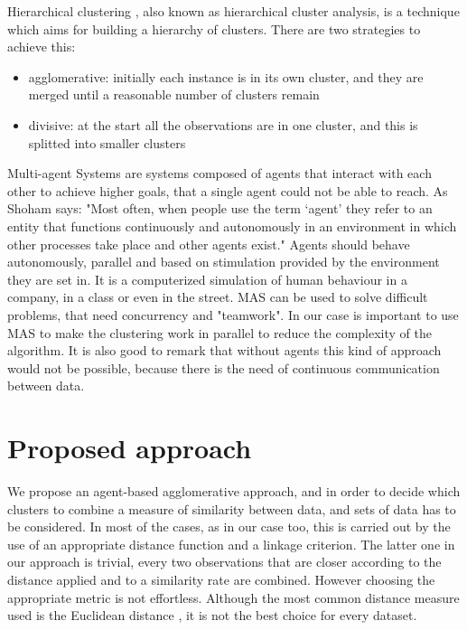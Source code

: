 \documentclass[conference]{IEEEtran}
\begin{document}
Hierarchical clustering \cite{website:hierarchical}, also known as hierarchical cluster analysis, is a technique which aims for building a hierarchy of clusters. There are two strategies to achieve this:
\renewcommand{\labelitemi}{$\bullet$}
\begin{itemize}
\item agglomerative: initially each instance is in its own cluster, and they are merged until a reasonable number of clusters remain
\item divisive: at the start all the observations are in one cluster, and this is splitted into smaller clusters
\end{itemize}

Multi-agent Systems are systems composed of agents that interact with each other to achieve higher goals, that a single agent could not be able to reach. As Shoham says: "Most often, when people use the term ‘agent’ they refer to an entity that functions continuously and autonomously in an environment in which other processes take place and other agents exist." \cite{Agents}
Agents should behave autonomously, parallel and based on stimulation provided by the environment they are set in. It is a computerized simulation of human behaviour in a company, in a class or even in the street. MAS can be used to solve difficult problems, that need concurrency and "teamwork". In our case is important to use MAS to make the clustering work in parallel to reduce the complexity of the algorithm. It is also good to remark that without agents this kind of approach would not be possible, because there is the need of continuous communication between data.

\section{Proposed approach}
\label{Proposed approach}

We propose an agent-based agglomerative approach, and in order to decide which clusters to combine a measure of similarity between data, and sets of data has to be considered. In most of the cases, as in our case too, this is carried out by the use of an appropriate distance function and a linkage criterion. The latter one in our approach is trivial, every two observations that are closer according to the distance applied and to a similarity rate are combined. However choosing the appropriate metric is not effortless. Although the most common distance measure used is the Euclidean distance \cite{website:euclidean} , it is not the best choice for every dataset.
\end{document}
